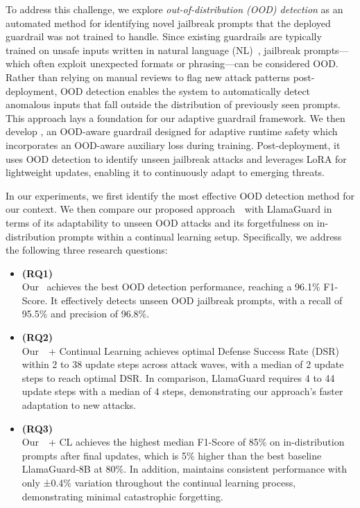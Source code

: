 To address this challenge, we explore \emph{out-of-distribution (OOD) detection} as an automated method for identifying novel jailbreak prompts that the deployed guardrail was not trained to handle.
Since existing guardrails are typically trained on unsafe inputs written in natural language (NL)~\cite{markov2023holistic, inan2023llama}, jailbreak prompts—which often exploit unexpected formats or phrasing—can be considered OOD.
Rather than relying on manual reviews to flag new attack patterns post-deployment, OOD detection enables the system to automatically detect anomalous inputs that fall outside the distribution of previously seen prompts.
This approach lays a foundation for our adaptive guardrail framework.
We then develop \ourapp, an OOD-aware guardrail designed for adaptive runtime safety which incorporates an OOD-aware auxiliary loss during training. Post-deployment, it uses OOD detection to identify unseen jailbreak attacks and leverages LoRA for lightweight updates, enabling it to continuously adapt to emerging threats.

In our experiments, we first identify the most effective OOD detection method for our context. We then compare our proposed approach~\ourapp~with LlamaGuard in terms of its adaptability to unseen OOD attacks and its forgetfulness on in-distribution prompts within a continual learning setup. Specifically, we address the following three research questions:

\begin{itemize}
\item {\bf (RQ1) \rqone} \\
Our \ourapp~achieves the best OOD detection performance, reaching a 96.1\% F1-Score. It effectively detects unseen OOD jailbreak prompts, with a recall of 95.5\% and precision of 96.8\%.

\item {\bf (RQ2) \rqtwo}\\
Our~\ourapp~+ Continual Learning achieves optimal Defense Success Rate (DSR) within 2 to 38 update steps across attack waves, with a median of 2 update steps to reach optimal DSR. In comparison, LlamaGuard requires 4 to 44 update steps with a median of 4 steps, demonstrating our approach's faster adaptation to new attacks.

\item {\bf (RQ3) \rqthree}\\
Our~\ourapp~+ CL achieves the highest median F1-Score of 85\% on in-distribution prompts after final updates, which is 5\% higher than the best baseline LlamaGuard-8B at 80\%.
In addition, \ourapp maintains consistent performance with only ±0.4\% variation throughout the continual learning process, demonstrating minimal catastrophic forgetting. 
\end{itemize}

